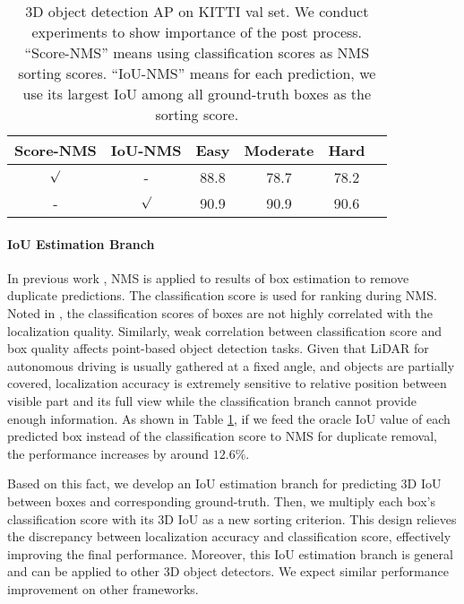 \documentclass[10pt,twocolumn,letterpaper]{article}
\begin{document}
\begin{table}[t]
   \centering \addtolength{\tabcolsep}{-1pt}
   \footnotesize
   \begin{tabular}{|c|c|c|c|c|c|}
       \hline
       Score-NMS & IoU-NMS & Easy & Moderate & Hard \\
       \hline
       $\surd$ & - & 88.8 & 78.7 & 78.2 \\
       - & $\surd$ & 90.9 & 90.9 & 90.6 \\
      \hline
   \end{tabular}\vspace{0.3cm}
   \caption{3D object detection AP on KITTI val set. We conduct experiments to show importance of the post process. ``Score-NMS'' means using classification scores as NMS sorting scores. ``IoU-NMS'' means for each prediction, we use its largest IoU among all ground-truth boxes as the sorting score. }
   \label{tab:whether_nms_iou_nearest}
\end{table}

\vspace{-0.1in}
\paragraph{IoU Estimation Branch}
\label{IoU_estimation_framework}
In previous work \cite{lang2018pointpillars,yan2018second,VOXELNET,AVOD,shi2018pointrcnn}, NMS is applied to results of box estimation to remove duplicate predictions. The classification score is used for ranking during NMS. Noted in \cite{jiang2018acquisition,liu2015box,qi2018sequential}, the classification scores of boxes are not highly correlated with the localization quality. Similarly, weak correlation between classification score and box quality affects point-based object detection tasks. Given that LiDAR for autonomous driving is usually gathered at a fixed angle, and objects are partially covered, localization accuracy is extremely sensitive to relative position between visible part and its full view while the classification branch cannot provide enough information. 
As shown in Table \ref{tab:whether_nms_iou_nearest}, if we feed the oracle IoU value of each predicted box instead of the classification score to NMS for duplicate removal, the performance increases by around $12.6 \%$.

Based on this fact, we develop an IoU estimation branch for predicting 3D IoU between boxes and corresponding ground-truth. Then, we multiply each box's classification score with its 3D IoU as a new sorting criterion. This design relieves the discrepancy between localization accuracy and classification score, effectively improving the final performance. Moreover, this IoU estimation branch is general and can be applied to other 3D object detectors. We expect similar performance improvement on other frameworks.
\end{document}
